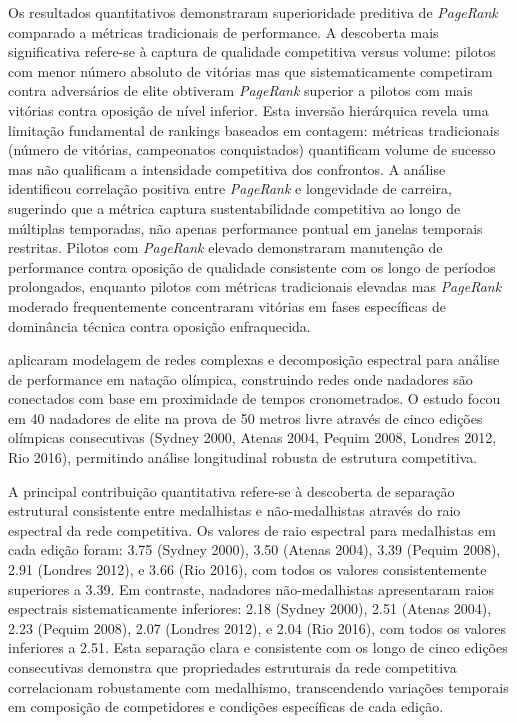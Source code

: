 Os resultados quantitativos demonstraram superioridade preditiva de \textit{PageRank}{} comparado a métricas tradicionais de performance. A descoberta mais significativa refere-se à captura de qualidade competitiva versus volume: pilotos com menor número absoluto de vitórias mas que sistematicamente competiram contra adversários de elite obtiveram \textit{PageRank}{} superior a pilotos com mais vitórias contra oposição de nível inferior. Esta inversão hierárquica revela uma limitação fundamental de rankings baseados em contagem: métricas tradicionais (número de vitórias, campeonatos conquistados) quantificam volume de sucesso mas não qualificam a intensidade competitiva dos confrontos. A análise identificou correlação positiva entre \textit{PageRank}{} e longevidade de carreira, sugerindo que a métrica captura sustentabilidade competitiva ao longo de múltiplas temporadas, não apenas performance pontual em janelas temporais restritas. Pilotos com \textit{PageRank}{} elevado demonstraram manutenção de performance contra oposição de qualidade consistente com os longo de períodos prolongados, enquanto pilotos com métricas tradicionais elevadas mas \textit{PageRank}{} moderado frequentemente concentraram vitórias em fases específicas de dominância técnica contra oposição enfraquecida.

 aplicaram modelagem de redes complexas e decomposição espectral para análise de performance em natação olímpica, construindo redes onde nadadores são conectados com base em proximidade de tempos cronometrados. O estudo focou em 40 nadadores de elite na prova de 50 metros livre através de cinco edições olímpicas consecutivas (Sydney 2000, Atenas 2004, Pequim 2008, Londres 2012, Rio 2016), permitindo análise longitudinal robusta de estrutura competitiva.

A principal contribuição quantitativa refere-se à descoberta de separação estrutural consistente entre medalhistas e não-medalhistas através do raio espectral da rede competitiva. Os valores de raio espectral para medalhistas em cada edição foram: 3.75 (Sydney 2000), 3.50 (Atenas 2004), 3.39 (Pequim 2008), 2.91 (Londres 2012), e 3.66 (Rio 2016), com todos os valores consistentemente superiores a 3.39. Em contraste, nadadores não-medalhistas apresentaram raios espectrais sistematicamente inferiores: 2.18 (Sydney 2000), 2.51 (Atenas 2004), 2.23 (Pequim 2008), 2.07 (Londres 2012), e 2.04 (Rio 2016), com todos os valores inferiores a 2.51. Esta separação clara e consistente com os longo de cinco edições consecutivas demonstra que propriedades estruturais da rede competitiva correlacionam robustamente com medalhismo, transcendendo variações temporais em composição de competidores e condições específicas de cada edição.

